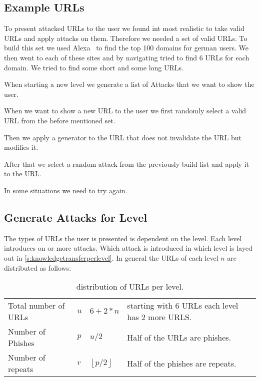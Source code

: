 \subsection{Example URLs}
To present attacked URLs to the user we found int most realistic to take valid URLs and apply attacks on them.
Therefore we needed a set of valid URLs.
To build this set we used Alexa~\cite{alexa} to find the top 100 domains for german users.
We then went to each of these sites and by navigating tried to find 6 URLs for each domain.
We tried to find some short and some long URLs.
\begin{description}[leftmargin=0cm]
\item[Generate Attacks for Level]When starting a new level we generate a list of Attacks that we want to show the user.
\item[Select Valid URL]When we want to show a new URL to the user we first randomly select a valid URL from the before mentioned set.
\item[Apply Generator]Then we apply a generator to the URL that does not invalidate the URL but modifies it.
\item[Apply Attack]After that we select a random attack from the previously build list and apply it to the URL.
\item[Repeat]In some situations we need to try again.
\end{description}
\subsection{Generate Attacks for Level}
The types of URLs the user is presented is dependent on the level.
Each level introduces on or more attacks.
Which attack is introduced in which level is layed out in \autoref{s:knowledgetransferperlevel}.
In general the URLs of each level $n$ are distributed as follows:
\begin{table}[hHtbp]
\centering
\begin{tabular}{|llll|}
\hline
Total number of URLs&$u$&$6+2*n$&starting with 6 URLs each level has 2 more URLS.\\
Number of Phishes&$p$&$u/2$&Half of the URLs are phishes.\\
Number of repeats&$r$&$\left\lfloor p/2 \right\rfloor$&Half of the phishes are repeats.\\
\hline
\end{tabular}
\caption{distribution of URLs per level.}
\label{t:levelurls}
\end{table}


